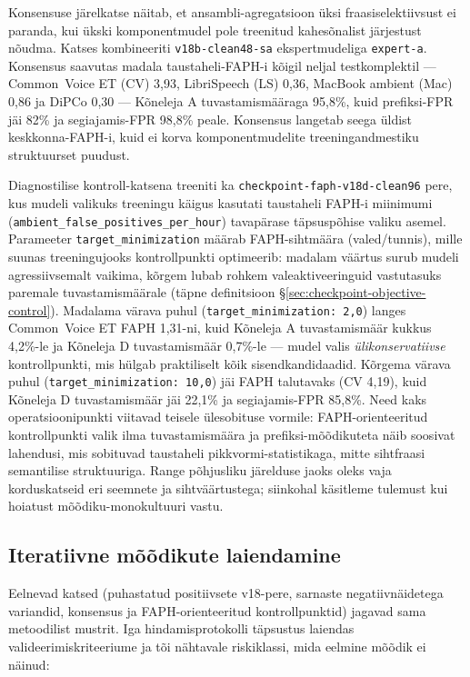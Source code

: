 Konsensuse järelkatse näitab, et ansambli-agregatsioon üksi fraasiselektiivsust ei paranda, kui ükski komponentmudel pole treenitud kahesõnalist järjestust nõudma. Katses kombineeriti \texttt{v18b-clean48-sa} ekspertmudeliga \texttt{expert-a}. Konsensus saavutas madala taustaheli-FAPH-i kõigil neljal testkomplektil --- Common~Voice ET (CV) 3,93, LibriSpeech (LS) 0,36, MacBook ambient (Mac) 0,86 ja DiPCo 0,30 --- Kõneleja A tuvastamismääraga 95,8\%, kuid prefiksi-FPR jäi 82\% ja segiajamis-FPR 98,8\% peale. Konsensus langetab seega üldist keskkonna-FAPH-i, kuid ei korva komponentmudelite treeningandmestiku struktuurset puudust.

Diagnostilise kontroll-katsena treeniti ka \texttt{checkpoint-faph-v18d-clean96} pere, kus mudeli valikuks treeningu käigus kasutati taustaheli FAPH-i miinimumi (\texttt{ambient\_false\_positives\_per\_hour}) tavapärase täpsuspõhise valiku asemel. Parameeter \texttt{target\_minimization} määrab FAPH-sihtmäära (valed/tunnis), mille suunas treeningujooks kontrollpunkti optimeerib: madalam väärtus surub mudeli agressiivsemalt vaikima, kõrgem lubab rohkem valeaktiveeringuid vastutasuks paremale tuvastamismäärale (täpne definitsioon §\ref{sec:checkpoint-objective-control}). Madalama värava puhul (\texttt{target\_minimization: 2,0}) langes Common~Voice ET FAPH 1,31-ni, kuid Kõneleja A tuvastamismäär kukkus 4,2\%-le ja Kõneleja D tuvastamismäär 0,7\%-le --- mudel valis \emph{ülikonservatiivse} kontrollpunkti, mis hülgab praktiliselt kõik sisendkandidaadid. Kõrgema värava puhul (\texttt{target\_minimization: 10,0}) jäi FAPH talutavaks (CV 4,19), kuid Kõneleja D tuvastamismäär jäi 22,1\% ja segiajamis-FPR 85,8\%. Need kaks operatsioonipunkti viitavad teisele ülesobituse vormile: FAPH-orienteeritud kontrollpunkti valik ilma tuvastamismäära ja prefiksi-mõõdikuteta näib soosivat lahendusi, mis sobituvad taustaheli pikkvormi-statistikaga, mitte sihtfraasi semantilise struktuuriga. Range põhjusliku järelduse jaoks oleks vaja korduskatseid eri seemnete ja sihtväärtustega; siinkohal käsitleme tulemust kui hoiatust mõõdiku-monokultuuri vastu.

\subsection{Iteratiivne mõõdikute laiendamine}
\label{sec:metric-iteration-conclusion}

Eelnevad katsed (puhastatud positiivsete v18-pere, sarnaste negatiivnäidetega variandid, konsensus ja FAPH-orienteeritud kontrollpunktid) jagavad sama metoodilist mustrit. Iga hindamisprotokolli täpsustus laiendas valideerimiskriteeriume ja tõi nähtavale riskiklassi, mida eelmine mõõdik ei näinud:

